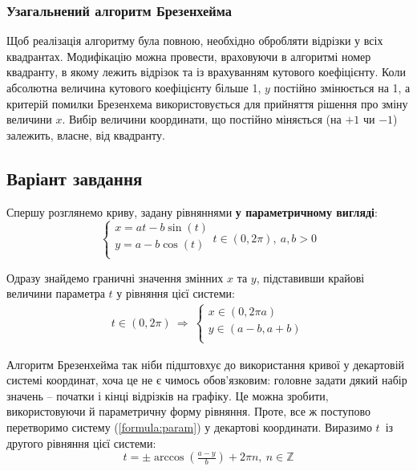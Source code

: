 \documentclass[a4paper,14pt]{extarticle} %
\begin{document}
\subsubsection*{Узагальнений алгоритм Брезенхейма}

Щоб реалізація алгоритму була повною, необхідно обробляти відрізки у всіх 
квадрантах. Модифікацію можна провести, враховуючи в алгоритмі номер квадранту, в якому лежить відрізок та із 
врахуванням кутового коефіцієнту. Коли абсолютна величина кутового коефіцієнту більше 1, $y$ постійно змінюється 
на 1, а критерій помилки Брезенхема використовується для прийняття рішення про зміну величини $x$. Вибір 
величини координати, що постійно міняється (на $+1$ чи $-1$) залежить, власне, від квадранту.

\subsection*{Варіант завдання}

Спершу розглянемо криву, задану рівняннями \textbf{у параметричному вигляді}:
\begin{equation}
    \begin{cases}
        x=at-b\sin (t) \\
        y=a-b\cos (t) \\
    \end{cases} t \in (0, 2\pi),\ a,b>0 \label{formula:param}
\end{equation}

Одразу знайдемо граничні значення змінних $x$ та $y$, підставивши крайові величини параметра $t$ у рівняння цієї системи:
\begin{align*}
    t \in (0, 2\pi) \ \Rightarrow \ 
    \begin{cases}
        x \in (0,2 \pi a) \\
        y \in (a-b,a+b) \\
    \end{cases}
\end{align*}

Алгоритм Брезенхейма так ніби підштовхує до використання кривої у декартовій системі координат, хоча це не є 
чимось обов'язковим: головне задати дякий набір значень -- початки і кінці відрізків на графіку. Це можна зробити, 
використовуючи й параметричну форму рівняння. Проте, все ж поступово перетворимо систему (\ref{formula:param}) у декартові координати. Виразимо $t$\, із другого рівняння 
цієї системи: \[ t=\pm \arccos(\tfrac{a-y}{b})+2\pi n,\ n \in \mathbb{Z} \]
\end{document}
